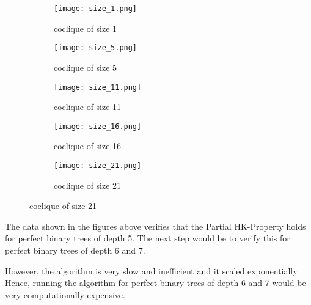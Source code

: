 \documentclass{amsart}
\theoremstyle{definition}
\begin{document}
\begin{appendix}
\begin{figure}[hbt!]
	\begin{subfigure}{.5\textwidth}
		\centering
		\texttt{[image: size\_1.png]}
		\caption{coclique of size 1}
	\end{subfigure}
	\begin{subfigure}{.5\textwidth}
		\centering
		\texttt{[image: size\_5.png]}
		\caption{coclique of size 5}
	\end{subfigure}
	\begin{subfigure}{.5\textwidth}
		\centering
		\texttt{[image: size\_11.png]}
		\caption{coclique of size 11}
	\end{subfigure}
	\begin{subfigure}{.5\textwidth}
		\centering
		\texttt{[image: size\_16.png]}
		\caption{coclique of size 16}
	\end{subfigure}
	\begin{subfigure}{.5\textwidth}
		\centering
		\texttt{[image: size\_21.png]}
		\caption{coclique of size 21}
	\end{subfigure}
\end{figure}

The data shown in the figures above verifies that the Partial HK-Property holds for perfect binary trees of depth 5. The next step would be to verify this for perfect binary trees of depth 6 and 7.

However, the algorithm is very slow and inefficient and it scaled exponentially. Hence, running the algorithm for perfect binary trees of depth 6 and 7 would be very computationally expensive.

\end{appendix}

\newpage





\end{document}
